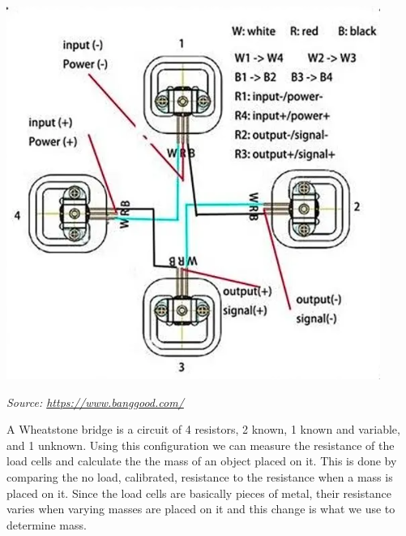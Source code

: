 \documentclass[10pt]{article}
\begin{document}
{\begin{flushleft}
{{\center\includegraphics[scale=.5]{loadcellwiring}\par}
{\textit{Source: \href{https://www.banggood.com/4pcs-DIY-50KG-Body-Load-Cell-Weight-Strain-Sensor-Resistance-With-HX711-AD-Module-p-1326815.html?utm_source=googleshopping&utm_medium=cpc_organic&gmcCountry=US&utm_content=shopping&utm_campaign=us-pc&currency=USD&createTmp=1&utm_source=googleshopping&utm_medium=cpc_bgs&utm_content=frank&utm_campaign=frank-ssc-us-toys-tool-ele-newcustom-ncv80-0116&ad_id=411455834827&gclid=Cj0KCQjwy6T1BRDXARIsAIqCTXpl9vvx29pgQ5I5bO3OfoMXg4CrioA-04iYSjtnyxtn5z5hVLJjgT4aAulwEALw_wcB&cur_warehouse=CN}{https://www.banggood.com/}}}

A Wheatstone bridge is a circuit of 4 resistors, 2 known, 1 known and variable, and 1 unknown. Using this configuration we can measure the resistance of the load cells and calculate the the mass of an object placed on it. This is done by comparing the no load, calibrated, resistance to the resistance when a mass is placed on it. Since the load cells are basically pieces of metal, their resistance varies when varying masses are placed on it and this change is what we use to determine mass.

}
\end{flushleft}}
\end{document}
